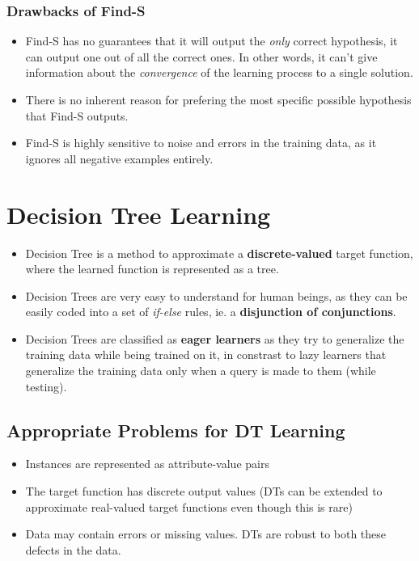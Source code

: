 \documentclass{article}
\theoremstyle{plain}
\theoremstyle{definition}
\begin{document}
\subsubsection{Drawbacks of Find-S}
\begin{itemize}
    \item Find-S has no guarantees that it will output the \textit{only} correct hypothesis, it can output one out of all the correct ones. In other words, it can't give information about the \textit{convergence} of the learning process to a single solution.
    
    \item There is no inherent reason for prefering the most specific possible hypothesis that Find-S outputs. 
    
    \item Find-S is highly sensitive to noise and errors in the training data, as it ignores all negative examples entirely. 
\end{itemize}

\section{Decision Tree Learning}
\begin{itemize}
    \item Decision Tree is a method to approximate a \textbf{discrete-valued} target function, where the learned function is represented as a tree. 
    
    \item Decision Trees are very easy to understand for human beings, as they can be easily coded into a set of \textit{if-else} rules, ie. a \textbf{disjunction of conjunctions}.
    
    \item Decision Trees are classified as \textbf{eager learners} as they try to generalize the training data while being trained on it, in constrast to lazy learners that generalize the training data only when a query is made to them (while testing). 
\end{itemize}

\subsection{Appropriate Problems for DT Learning}
\begin{itemize}
    \item Instances are represented as attribute-value pairs
    
    \item The target function has discrete output values (DTs can be extended to approximate real-valued target functions even though this is rare)
    
    \item Data may contain errors or missing values. DTs are robust to both these defects in the data.
\end{itemize}
\end{document}
